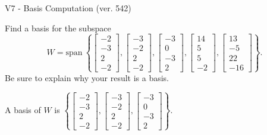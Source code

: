 \begin{exercise}
  \begin{exerciseTitle}V7 - Basis Computation (ver. 542)\end{exerciseTitle}
  \begin{exerciseStatement}
    Find a basis for the subspace 
\[W=\mathrm{span}\ \left\{\left[\begin{array}{r}
-2 \\
-3 \\
2 \\
-2
\end{array}\right] , \left[\begin{array}{r}
-3 \\
-2 \\
2 \\
-2
\end{array}\right] , \left[\begin{array}{r}
-3 \\
0 \\
-3 \\
2
\end{array}\right] , \left[\begin{array}{r}
14 \\
5 \\
5 \\
-2
\end{array}\right] , \left[\begin{array}{r}
13 \\
-5 \\
22 \\
-16
\end{array}\right]\right\}.\]
 Be sure to explain why your result is a basis.


  \end{exerciseStatement}
  \begin{exerciseAnswer}
   A basis of \(W\) is  \(\left\{\left[\begin{array}{r}
-2 \\
-3 \\
2 \\
-2
\end{array}\right] , \left[\begin{array}{r}
-3 \\
-2 \\
2 \\
-2
\end{array}\right] , \left[\begin{array}{r}
-3 \\
0 \\
-3 \\
2
\end{array}\right]\right\}\).
  


  \end{exerciseAnswer}
\end{exercise}
